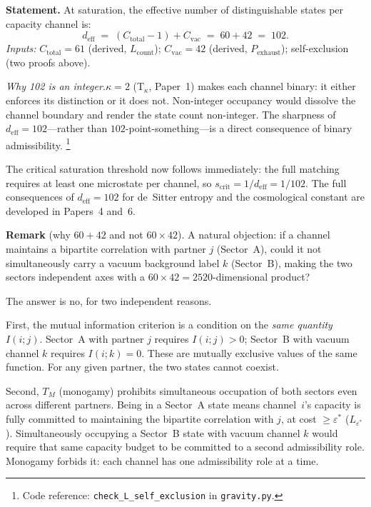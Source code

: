 \documentclass[11pt]{article}
\newcommand{\coderef}[2]{\footnote{Code reference: \texttt{#1} in \texttt{#2}.}}
\begin{document}
\begin{tcolorbox}[apfbox, title={$L_{\mathrm{self\text{-}excl}}$: Effective Dimension per Capacity Channel}]
\textbf{Statement.}  At saturation, the effective number of distinguishable states per capacity channel is:
\begin{equation}
d_{\mathrm{eff}} \;=\; (C_{\mathrm{total}} - 1) + C_{\mathrm{vac}} \;=\; 60 + 42 \;=\; 102.
\label{eq:deff}
\end{equation}
\textit{Inputs:} $C_{\mathrm{total}} = 61$ (derived, $L_{\mathrm{count}}$); $C_{\mathrm{vac}} = 42$ (derived, $P_{\mathrm{exhaust}}$); self-exclusion (two proofs above).

\smallskip
\noindent\textit{Why 102 is an integer.}\quad $\kappa = 2$ (T$_\kappa$, Paper~1) makes each channel binary: it either enforces its distinction or it does not.  Non-integer occupancy would dissolve the channel boundary and render the state count non-integer.  The sharpness of $d_{\mathrm{eff}} = 102$---rather than $102$-point-something---is a direct consequence of binary admissibility.
\coderef{check\_L\_self\_exclusion}{gravity.py}
\end{tcolorbox}

The critical saturation threshold now follows immediately: the full matching requires at least one microstate per channel, so $s_{\mathrm{crit}} = 1/d_{\mathrm{eff}} = 1/102$.  The full consequences of $d_{\mathrm{eff}} = 102$ for de~Sitter entropy and the cosmological constant are developed in Papers~4 and~6.

\smallskip
\noindent\textbf{Remark} (why $60 + 42$ and not $60 \times 42$).\quad
A natural objection: if a channel maintains a bipartite correlation with partner $j$ (Sector~A), could it not simultaneously carry a vacuum background label $k$ (Sector~B), making the two sectors independent axes with a $60 \times 42 = 2520$-dimensional product?

The answer is no, for two independent reasons.

First, the mutual information criterion is a condition on the \emph{same quantity} $I(i;j)$.  Sector~A with partner $j$ requires $I(i;j) > 0$; Sector~B with vacuum channel $k$ requires $I(i;k) = 0$.  These are mutually exclusive values of the same function.  For any given partner, the two states cannot coexist.

Second, $T_M$ (monogamy) prohibits simultaneous occupation of both sectors even across different partners.  Being in a Sector~A state means channel~$i$'s capacity is fully committed to maintaining the bipartite correlation with $j$, at cost $\ge \varepsilon^*$ ($L_{\varepsilon^*}$).  Simultaneously occupying a Sector~B state with vacuum channel $k$ would require that same capacity budget to be committed to a second admissibility role.  Monogamy forbids it: each channel has one admissibility role at a time.
\end{document}
